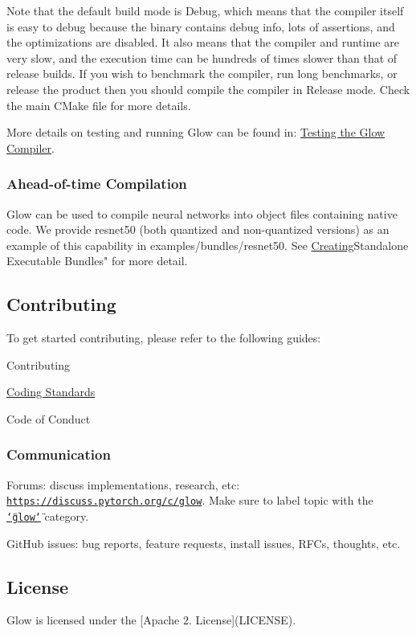 Note that the default build mode is {\ttfamily Debug}, which means that the compiler itself is easy to debug because the binary contains debug info, lots of assertions, and the optimizations are disabled. It also means that the compiler and runtime are very slow, and the execution time can be hundreds of times slower than that of release builds. If you wish to benchmark the compiler, run long benchmarks, or release the product then you should compile the compiler in Release mode. Check the main C\+Make file for more details.

More details on testing and running Glow can be found in\+: \hyperlink{md_docs__testing}{Testing the Glow Compiler}.

\subsubsection*{Ahead-\/of-\/time Compilation}

Glow can be used to compile neural networks into object files containing native code. We provide resnet50 (both quantized and non-\/quantized versions) as an example of this capability in {\ttfamily examples/bundles/resnet50}. See \hyperlink{md_docs__a_o_t}{Creating}Standalone Executable Bundles" for more detail.

\subsection*{Contributing}

To get started contributing, please refer to the following guides\+:
\begin{DoxyItemize}
\item Contributing
\item \hyperlink{md_docs__coding_standards}{Coding Standards}
\item Code of Conduct
\end{DoxyItemize}

\subsubsection*{Communication}


\begin{DoxyItemize}
\item Forums\+: discuss implementations, research, etc\+: \href{https://discuss.pytorch.org/c/glow}{\tt https\+://discuss.\+pytorch.\+org/c/glow}. Make sure to label topic with the \href{https://discuss.pytorch.org/c/glow}{\tt \char`\"{}glow\char`\"{}} category.
\item Git\+Hub issues\+: bug reports, feature requests, install issues, R\+F\+Cs, thoughts, etc.
\end{DoxyItemize}

\subsection*{License}

Glow is licensed under the \mbox{[}Apache 2. License\mbox{]}(L\+I\+C\+E\+N\+SE). 